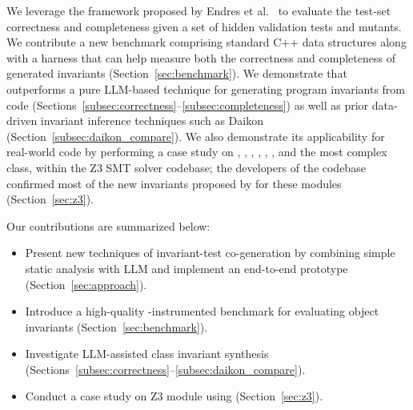 We leverage the framework proposed by Endres et al.~\cite{nl2postcond} to evaluate the test-set correctness and completeness given a set of hidden validation tests and mutants. 
We contribute a new benchmark comprising standard C++ data structures along with a harness that can help measure both the correctness and completeness of generated invariants (Section~\ref{sec:benchmark}).
We demonstrate that \tech outperforms a pure LLM-based technique for generating program invariants from code (Sections~\ref{subsec:correctness}--\ref{subsec:completeness}) as well as prior data-driven invariant inference techniques such as Daikon (Section~\ref{subsec:daikon_compare}).
We also demonstrate its applicability for real-world code by performing a case study on , , , , , , and the most complex class,  within the Z3 SMT solver codebase; the developers of the codebase confirmed most of the new invariants proposed by \tech for these modules (Section~\ref{sec:z3}). 

Our contributions are summarized below:
\begin{itemize}
    \item Present new techniques of invariant-test co-generation by combining simple static analysis with LLM and implement an end-to-end prototype (Section~\ref{sec:approach}).
    \item Introduce a high-quality \tech-instrumented benchmark for evaluating object invariants  (Section~\ref{sec:benchmark}).
    \item Investigate LLM-assisted class invariant synthesis (Sections~\ref{subsec:correctness}--\ref{subsec:daikon_compare}).
    \item Conduct a case study on Z3  module using \tech (Section~\ref{sec:z3}).
\end{itemize}



